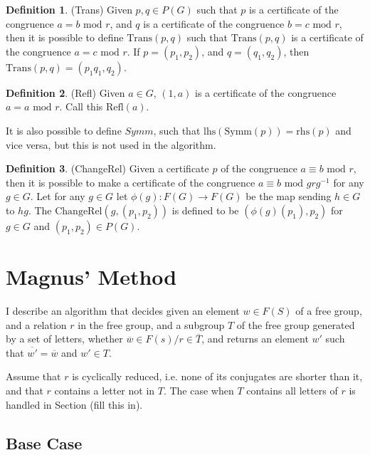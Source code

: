 \documentclass[11pt]{article} %
\theoremstyle{definition}
\theoremstyle{definition}
\theoremstyle{definition}
\theoremstyle{definition}
\theoremstyle{definition}
\theoremstyle{definition}
\newtheorem{subdef}{Definition}[theorem]
\begin{document}
\begin{subdef}(Trans)
  Given $p,q \in P(G)$ such that $p$ is a certificate of the congruence $a = b \text{ mod } r$,
  and $q$ is a certificate of the congruence $b = c \text{ mod } r$, then it is possible to define
  $\text{Trans}(p,q)$ such that $\text{Trans}(p,q)$ is a certificate of the congruence $a = c \text{ mod } r$.
  If $p = (p_1, p_2)$, and $q = (q_1, q_2)$, then $\text{Trans}(p,q) = (p_1q_1, q_2)$.
\end{subdef}

\begin{subdef}(Refl)
  Given $a \in G$, $(1, a)$ is a certificate of the congruence $a = a \text{ mod } r$. Call
  this $\text{Refl}(a)$.
\end{subdef}

It is also possible to define $\textit{Symm}$, such that $\text{lhs}(\text{Symm}(p)) = \text{rhs}(p)$
and vice versa, but this is not used in the algorithm.

\begin{subdef}(ChangeRel)
  Given a certificate $p$ of the congruence $a \equiv b \text{ mod } r$, then it is possible
  to make a certificate of the congruence $a \equiv b \text{ mod } g r g^{-1}$ for any $g \in G$.
  Let for any $g \in G$ let $\phi(g) : F(G) \to F(G)$ be the map sending $h \in G$ to
  $hg$. The $\text{ChangeRel}(g,(p_1,p_2))$ is defined to be $(\phi(g)(p_1), p_2)$ for
  $g \in G$ and $(p_1, p_2) \in P(G)$.
\end{subdef}

\section{Magnus' Method}

I describe an algorithm that decides given an element $w \in F(S)$ of a free group,
and a relation $r$ in the free group, and a subgroup $T$ of the free group
generated by a set of letters, whether $\overline{w} \in F(s) / r \in \overline{T}$,
and returns an element $w'$ such that $\overline{w'} = \overline{w}$ and $w' \in T$.

Assume that $r$ is cyclically reduced, i.e. none
of its conjugates are shorter than it, and that $r$ contains a letter not in $T$.
The case when $T$ contains all letters of $r$ is handled in Section (fill this in).

\subsection{Base Case}
\end{document}
